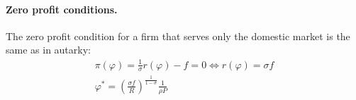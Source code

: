 \begin{solution}
	\paragraph{Zero profit conditions.} The zero profit condition for a firm that serves only the domestic market is the same as in autarky:
	\begin{align*}
		\pi(\varphi) = \frac{1}{\sigma} r(\varphi) - f = 0 \iff r(\varphi) = \sigma f \\
		\varphi^* = \left( \frac{\sigma f}{R} \right)^{\frac{1}{1 - \sigma}} \frac{1}{\rho P}
	\end{align*}
\end{solution}